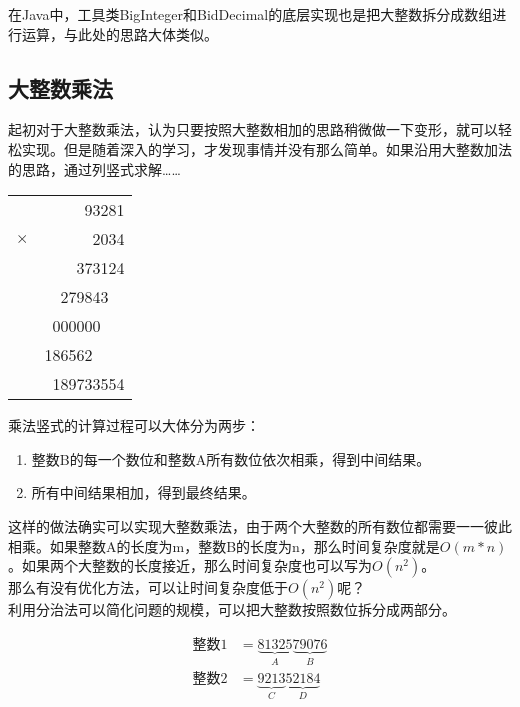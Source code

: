 在Java中，工具类BigInteger和BidDecimal的底层实现也是把大整数拆分成数组进行运算，与此处的思路大体类似。\\

\subsection{大整数乘法}

起初对于大整数乘法，认为只要按照大整数相加的思路稍微做一下变形，就可以轻松实现。但是随着深入的学习，才发现事情并没有那么简单。如果沿用大整数加法的思路，通过列竖式求解……

\begin{table}[H]
	\centering
	\begin{tabular}{cD{.}{.}{3}}
		           & 93281         \\
		$ \times $ & 2034          \\
		\hline
		           & 373124        \\
		           & 279843\ \     \\
		           & 000000\ \ \   \\
		           & 186562\ \ \ \ \\
		\hline
		           & 189733554
	\end{tabular}
\end{table}

乘法竖式的计算过程可以大体分为两步：

\begin{enumerate}
	\item 整数B的每一个数位和整数A所有数位依次相乘，得到中间结果。
	\item 所有中间结果相加，得到最终结果。
\end{enumerate}

这样的做法确实可以实现大整数乘法，由于两个大整数的所有数位都需要一一彼此相乘。如果整数A的长度为m，整数B的长度为n，那么时间复杂度就是$ O(m * n) $。如果两个大整数的长度接近，那么时间复杂度也可以写为$ O(n^2) $。\\

那么有没有优化方法，可以让时间复杂度低于$ O(n^2) $呢？\\

利用分治法可以简化问题的规模，可以把大整数按照数位拆分成两部分。

\vspace{-1cm}

\begin{align*}
	\text{整数1} & = \underbrace{81325}_{A}\underbrace{79076}_{B} \\
	\text{整数2} & = \underbrace{9213}_{C}\underbrace{52184}_{D}
\end{align*}

